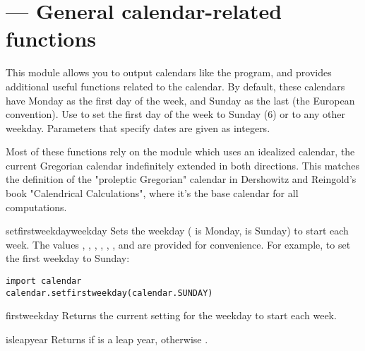 \section{ ---
         General calendar-related functions}


This module allows you to output calendars like the \UNIX{}
 program, and provides additional useful functions
related to the calendar. By default, these calendars have Monday as
the first day of the week, and Sunday as the last (the European
convention). Use  to set the first day of the
week to Sunday (6) or to any other weekday.  Parameters that specify
dates are given as integers.

Most of these functions rely on the  module which
uses an idealized calendar, the current Gregorian calendar indefinitely
extended in both directions.  This matches the definition of the
"proleptic Gregorian" calendar in Dershowitz and Reingold's book
"Calendrical Calculations", where it's the base calendar for all
computations.

\begin{funcdesc}{setfirstweekday}{weekday}
Sets the weekday ( is Monday,  is Sunday) to start
each week. The values , ,
, , ,
, and  are provided for
convenience. For example, to set the first weekday to Sunday:

\begin{verbatim}
import calendar
calendar.setfirstweekday(calendar.SUNDAY)
\end{verbatim}
\end{funcdesc}

\begin{funcdesc}{firstweekday}{}
Returns the current setting for the weekday to start each week.
\end{funcdesc}

\begin{funcdesc}{isleap}{year}
Returns  if  is a leap year, otherwise .
\end{funcdesc}

